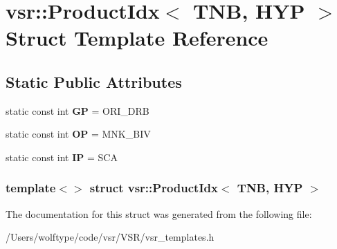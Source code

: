 \hypertarget{structvsr_1_1_product_idx_3_01_t_n_b_00_01_h_y_p_01_4}{\section{vsr\-:\-:Product\-Idx$<$ T\-N\-B, H\-Y\-P $>$ Struct Template Reference}
\label{structvsr_1_1_product_idx_3_01_t_n_b_00_01_h_y_p_01_4}
}
\subsection*{Static Public Attributes}
\begin{DoxyCompactItemize}
\item 
\hypertarget{structvsr_1_1_product_idx_3_01_t_n_b_00_01_h_y_p_01_4_a2e6f98fa5e43e537c39a1c947a17180d}{static const int {\bfseries G\-P} = O\-R\-I\-\_\-\-D\-R\-B}\label{structvsr_1_1_product_idx_3_01_t_n_b_00_01_h_y_p_01_4_a2e6f98fa5e43e537c39a1c947a17180d}

\item 
\hypertarget{structvsr_1_1_product_idx_3_01_t_n_b_00_01_h_y_p_01_4_acbd68e9b4856c1488aab91a8accd950e}{static const int {\bfseries O\-P} = M\-N\-K\-\_\-\-B\-I\-V}\label{structvsr_1_1_product_idx_3_01_t_n_b_00_01_h_y_p_01_4_acbd68e9b4856c1488aab91a8accd950e}

\item 
\hypertarget{structvsr_1_1_product_idx_3_01_t_n_b_00_01_h_y_p_01_4_a7fbf24e16ae106cec6ccb39ed2286b8a}{static const int {\bfseries I\-P} = S\-C\-A}\label{structvsr_1_1_product_idx_3_01_t_n_b_00_01_h_y_p_01_4_a7fbf24e16ae106cec6ccb39ed2286b8a}

\end{DoxyCompactItemize}
\subsubsection*{template$<$$>$ struct vsr\-::\-Product\-Idx$<$ T\-N\-B, H\-Y\-P $>$}



The documentation for this struct was generated from the following file\-:\begin{DoxyCompactItemize}
\item 
/\-Users/wolftype/code/vsr/\-V\-S\-R/vsr\-\_\-templates.\-h\end{DoxyCompactItemize}
